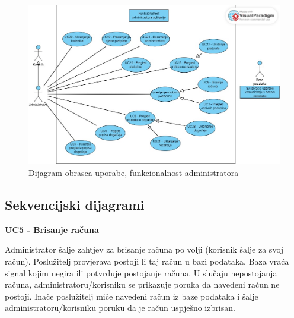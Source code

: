					\begin{figure}[htbp]
						\centering
						\includegraphics[width=1\textwidth]{dijagrami/obrazac_funkcionalnost_administratora.jpg}
						\caption{Dijagram obrasca uporabe, funkcionalnost administratora}
					\label{fig:my_image}
					\end{figure}


				\eject
				\pagebreak
			
			\newpage
			\subsection{Sekvencijski dijagrami}
				
				

				\noindent \textbf{UC5 - Brisanje računa}

				\noindent Administrator šalje zahtjev za brisanje računa po volji (korisnik šalje za svoj račun). 
				Poslužitelj provjerava postoji li taj račun u bazi podataka.
				Baza vraća signal kojim negira ili potvrđuje postojanje računa.
				U slučaju nepostojanja računa, administratoru/korisniku se 
				prikazuje poruka da navedeni račun ne postoji. Inače poslužitelj 
				miče navedeni račun iz baze podataka i šalje administratoru/korisniku 
				poruku da je račun uspješno izbrisan.


